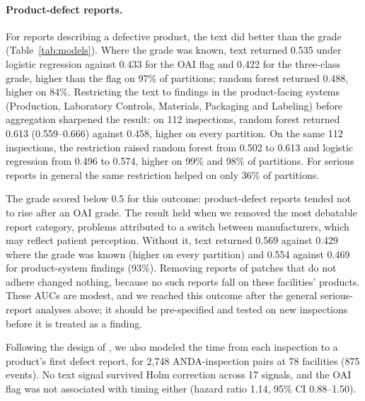 \documentclass[12pt]{article}
\begin{document}
\paragraph{Product-defect reports.} For reports describing a defective
product, the text did better than the grade (Table~\ref{tab:models}).
Where the grade was known, text returned 0.535 under logistic regression
against 0.433 for the OAI flag and 0.422 for the three-class grade, higher
than the flag on 97\% of partitions; random forest returned 0.488, higher
on 84\%. Restricting the text to findings in the product-facing systems
(Production, Laboratory Controls, Materials, Packaging and Labeling)
before aggregation sharpened the result: on 112 inspections, random forest
returned 0.613 (0.559--0.666) against 0.458, higher on every partition. On
the same 112 inspections, the restriction raised random forest from 0.502
to 0.613 and logistic regression from 0.496 to 0.574, higher on 99\% and
98\% of partitions. For serious reports in general the same restriction
helped on only 36\% of partitions.

The grade scored below 0.5 for this outcome: product-defect reports tended
not to rise after an OAI grade. The result held when we removed the most
debatable report category, problems attributed to a switch between
manufacturers, which may reflect patient perception. Without it, text
returned 0.569 against 0.429 where the grade was known (higher on every
partition) and 0.554 against 0.469 for product-system findings (93\%).
Removing reports of patches that do not adhere changed nothing, because no
such reports fall on these facilities' products. These AUCs are modest, and
we reached this outcome after the general serious-report analyses above;
it should be pre-specified and tested on new inspections before it is
treated as a finding.

Following the design of \citet{Li2026LLMDevice}, we also modeled the time
from each inspection to a product's first defect report, for 2,748
ANDA-inspection pairs at 78 facilities (875 events). No text signal
survived Holm correction across 17 signals, and the OAI flag was not
associated with timing either (hazard ratio 1.14, 95\% CI 0.88--1.50).
\end{document}
